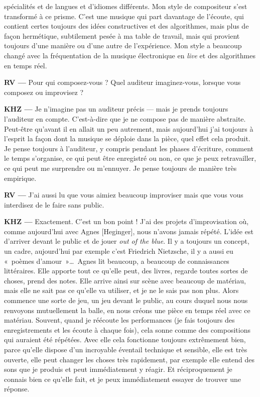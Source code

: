 \documentclass[a4paper,12pt]{article}
\newcommand{\guill}[1]{«~#1~»}
\begin{document}
spécialités et de langues et d'idiomes différents. Mon style de compositeur s'est transformé à ce prisme. C'est une musique qui part davantage de l'écoute, qui contient certes toujours des idées constructives et des algorithmes, mais plus de façon hermétique, subtilement pesée à ma table de travail, mais qui provient toujours d'une manière ou d'une autre de l'expérience. Mon style a beaucoup changé avec la fréquentation de la musique électronique en \emph{live} et des algorithmes en temps réel.

\textbf{RV ---} Pour qui composez-vous ? Quel auditeur imaginez-vous, lorsque vous composez ou improvisez ?

\textbf{KHZ ---} Je n'imagine pas un auditeur précis --- mais je prends toujours l'auditeur en compte. C'est-à-dire que je ne compose pas de manière abstraite. Peut-être qu'avant il en allait un peu autrement, mais aujourd'hui j'ai toujours à l'esprit la façon dont la musique se déploie dans la pièce, quel effet cela produit. Je pense toujours à l'auditeur, y compris pendant les phases d'écriture, comment le temps s'organise, ce qui peut être enregistré ou non, ce que je peux retravailler, ce qui peut me surprendre ou m'ennuyer. Je pense toujours de manière très empirique.

\textbf{RV ---} J'ai aussi lu que vous aimiez beaucoup improviser mais que vous vous interdisez de le faire sans public.

\textbf{KHZ ---} Exactement. C'est un bon point ! J'ai des projets d'improvisation où, comme aujourd'hui avec Agnes [Heginger], nous n'avons jamais répété. L'idée est d'arriver devant le public et de jouer \emph{out of the blue}. Il y a toujours un concept, un cadre, aujourd'hui par exemple c'est Friedrich Nietzsche, il y a aussi eu \guill{poèmes d'amour}\dots~Agnes lit beaucoup, a beaucoup de connaissances littéraires. Elle apporte tout ce qu'elle peut, des livres, regarde toutes sortes de choses, prend des notes. Elle arrive ainsi sur scène avec beaucoup de matériau, mais elle ne sait pas ce qu'elle va utiliser, et je ne le sais pas non plus. Alors commence une sorte de jeu, un jeu devant le public, au cours duquel nous nous renvoyons mutuellement la balle, en nous créons une pièce en temps réel avec ce matériau. Souvent, quand je réécoute les performances (je fais toujours des enregistrements et les écoute à chaque fois), cela sonne comme des compositions qui auraient été répétées. Avec elle cela fonctionne toujours extrêmement bien, parce qu'elle dispose d'un incroyable éventail technique et sensible, elle est très ouverte, elle peut changer les choses très rapidement, par exemple elle entend des sons que je produis et peut immédiatement y réagir. Et réciproquement je connais bien ce qu'elle fait, et je peux immédiatement essayer de trouver une réponse.
\end{document}
